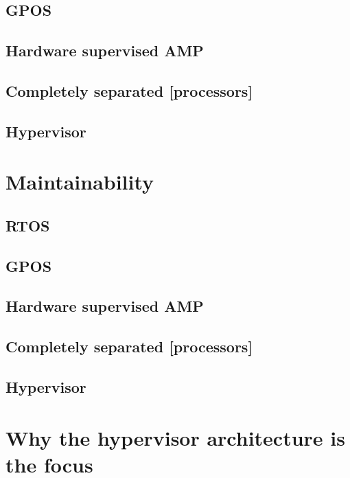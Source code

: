 \subsection{GPOS}
\subsection{Hardware supervised AMP}
\subsection{Completely separated [processors]}
\subsection{Hypervisor}


\section{Maintainability}
\subsection{RTOS}
\subsection{GPOS}
\subsection{Hardware supervised AMP}
\subsection{Completely separated [processors]}
\subsection{Hypervisor}


\section{Why the hypervisor architecture is the focus}
